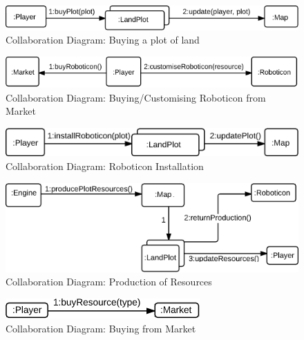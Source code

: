 \begin{figure}[h]
	\begin{centering}
		\includegraphics[width=\textwidth]{figures/collab1.png}
		\caption{Collaboration Diagram: Buying a plot of land}
		\label{fig:collab1}
	\end{centering}
\end{figure}
\begin{figure}
	\begin{centering}
		\includegraphics[width=\textwidth]{figures/collab2.png}
		\caption{Collaboration Diagram: Buying/Customising Roboticon from Market}
		\label{fig:collab2}
	\end{centering}
\end{figure}
\begin{figure}
	\begin{centering}
		\includegraphics[width=\textwidth]{figures/collab3.png}
		\caption{Collaboration Diagram: Roboticon Installation}
		\label{fig:collab3}
	\end{centering}
\end{figure}
\begin{figure}
	\begin{centering}
		\includegraphics[width=\textwidth]{figures/collab4.png}
		\caption{Collaboration Diagram: Production of Resources}
		\label{fig:collab4}
	\end{centering}
\end{figure}
\begin{figure}
	\begin{centering}
		\includegraphics[]{figures/collab5.png}
		\caption{Collaboration Diagram: Buying from Market}
		\label{fig:collab5}
	\end{centering}
\end{figure}
